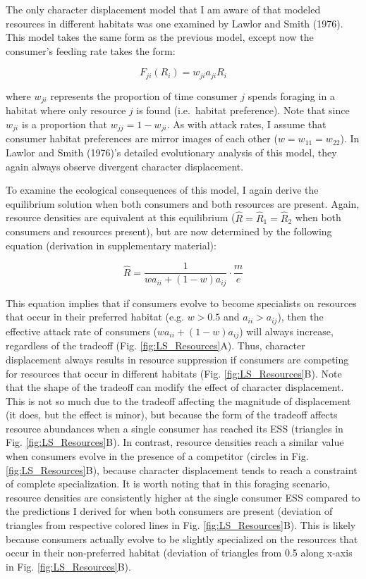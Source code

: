 \documentclass[11pt,]{article}
\begin{document}
The only character displacement model that I am aware of that modeled
resources in different habitats was one examined by Lawlor and Smith
(1976). This model takes the same form as the previous model, except now
the consumer's feeding rate takes the form:

\[F_{ji}(R_i)=w_{ji}a_{ji}R_i\]

where \(w_{ji}\) represents the proportion of time consumer \(j\) spends
foraging in a habitat where only resource \(j\) is found (i.e.~habitat
preference). Note that since \(w_{ji}\) is a proportion that
\(w_{jj}=1-w_{ji}\). As with attack rates, I assume that consumer
habitat preferences are mirror images of each other
(\(w=w_{11}=w_{22}\)). In Lawlor and Smith (1976)'s detailed
evolutionary analysis of this model, they again always observe divergent
character displacement.

To examine the ecological consequences of this model, I again derive the
equilibrium solution when both consumers and both resources are present.
Again, resource densities are equivalent at this equilibrium
(\(\hat R = \hat R_1 = \hat R_2\) when both consumers and resources
present), but are now determined by the following equation (derivation
in supplementary material):

\[\hat{R}=\frac{1}{wa_{ii}+(1-w)a_{ij}}\cdot\frac{m}{e}\]

This equation implies that if consumers evolve to become specialists on
resources that occur in their preferred habitat (e.g. \(w>0.5\) and
\(a_{ii}>a_{ij}\)), then the effective attack rate of consumers
(\(wa_{ii}+(1-w)a_{ij}\)) will always increase, regardless of the
tradeoff (Fig. \ref{fig:LS_Resources}A). Thus, character displacement
always results in resource suppression if consumers are competing for
resources that occur in different habitats (Fig.
\ref{fig:LS_Resources}B). Note that the shape of the tradeoff can modify
the effect of character displacement. This is not so much due to the
tradeoff affecting the magnitude of displacement (it does, but the
effect is minor), but because the form of the tradeoff affects resource
abundances when a single consumer has reached its ESS (triangles in Fig.
\ref{fig:LS_Resources}B). In contrast, resource densities reach a
similar value when consumers evolve in the presence of a competitor
(circles in Fig. \ref{fig:LS_Resources}B), because character
displacement tends to reach a constraint of complete specialization. It
is worth noting that in this foraging scenario, resource densities are
consistently higher at the single consumer ESS compared to the
predictions I derived for when both consumers are present (deviation of
triangles from respective colored lines in Fig.
\ref{fig:LS_Resources}B). This is likely because consumers actually
evolve to be slightly specialized on the resources that occur in their
non-preferred habitat (deviation of triangles from 0.5 along x-axis in
Fig. \ref{fig:LS_Resources}B).
\end{document}
